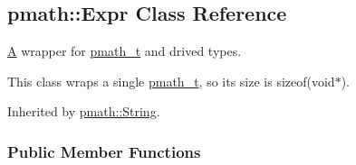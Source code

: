 \hypertarget{classpmath_1_1_expr}{
\subsection{pmath::Expr Class Reference}
\label{classpmath_1_1_expr}
}
\hyperlink{class_a}{A} wrapper for \hyperlink{classpmath__t}{pmath\_\-t} and drived types.

This class wraps a single \hyperlink{classpmath__t}{pmath\_\-t}, so its size is sizeof(void$\ast$).  


Inherited by \hyperlink{classpmath_1_1_string}{pmath::String}.

\subsubsection*{Public Member Functions}
